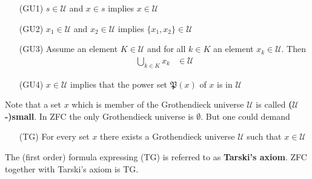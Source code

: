 \begin{enumerate}
\item[(GU1)]
$s \in \mathcal{U}$ and $x \in s$ implies $x \in \mathcal{U}$
\item[(GU2)]
$x_{1} \in \mathcal{U}$ and $x_{2} \in \mathcal{U}$ implies $\lbrace x_{1},x_{2} \rbrace \in \mathcal{U}$
\item[(GU3)]
Assume an element $K \in \mathcal{U}$ and for all $k \in K$ an element $x_{k} \in \mathcal{U}$. Then
\begin{align*}
  \bigcup_{k \in K}
  x_{k}
  &\in
  \mathcal{U}
\end{align*}
\item[(GU4)]
$x \in \mathcal{U}$ implies that the power set $\mathfrak{P}(x)$ of $x$ is in $\mathcal{U}$
\end{enumerate}
Note that a set $x$ which is member of the Grothendieck universe $\mathcal{U}$ is called \textbf{($\mathcal{U}$-)small}. In ZFC the only Grothendieck universe is $\emptyset$. But one could demand
\begin{enumerate}
\item[(TG)]
For every set $x$ there exists a Grothendieck universe $\mathcal{U}$ such that $x \in \mathcal{U}$
\end{enumerate}
The (first order) formula expressing (TG) is referred to as \textbf{Tarski's axiom}. ZFC together with Tarski's axiom is TG.

